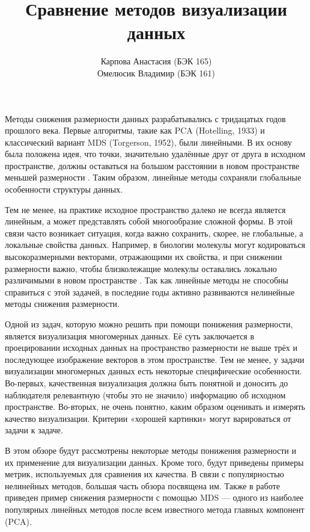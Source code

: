 \documentclass[10pt, a4paper]{extarticle}
\title{Сравнение методов визуализации данных}
\author{Карпова Анастасия (БЭК 165) \\ Омелюсик Владимир (БЭК 161)}
\begin{document}
\maketitle
\vspace{-1.1cm}
\tableofcontents
\vspace{1em}
\thispagestyle{empty}

Методы снижения размерности данных разрабатывались с тридацатых годов прошлого века. 
Первые алгоритмы, такие как PCA (Hotelling, 1933) и классический вариант MDS (Torgerson, 1952), были линейными.
В их основу была положена идея, что точки, значительно удалённые друг от друга в исходном пространстве, должны оставаться на большом расстоянии в новом пространстве меньшей размерности \cite{maaten2008visualizing}. 
Таким образом, линейные методы сохраняли глобальные особенности структуры данных. 

Тем не менее, на практике исходное пространство далеко не всегда является линейным, а может представлять собой многообразие сложной формы.
В этой связи часто возникает ситуация, когда важно сохранить, скорее, не глобальные, а локальные свойства данных. 
Например, в биологии молекулы могут кодироваться высокоразмерными векторами, отражающими их свойства, и при снижении размерности важно, чтобы близколежащие молекулы оставались локально различимыми в новом пространстве \cite{tmap}. 
Так как линейные методы не способны справиться с этой задачей, в последние годы активно развиваются нелинейные методы снижения размерности.

Одной из задач, которую можно решить при помощи понижения размерности, является визуализация многомерных данных.
Её суть заключается в  проецировании исходных данных на пространство размерности не выше трёх и последующее изображение векторов в этом пространстве. 
Тем не менее, у задачи визуализации многомерных данных есть некоторые специфические особенности. 
Во-первых, качественная визуализация должна быть понятной и доносить до наблюдателя релевантную (чтобы это не значило) информацию об исходном пространстве.
Во-вторых, не очень понятно, каким образом оценивать и измерять качество визуализации.
Критерии «хорошей картинки» могут варироваться от задачи к задаче.

В этом обзоре будут рассмотрены некоторые методы понижения размерности и их применение для визуализации данных.
Кроме того, будут приведены примеры метрик, используемых для сравнения их качества. 
В связи с популярностью нелинейных методов, большая часть обзора посвящена им. 
Также в работе приведен пример снижения размерности с помощью MDS — одного из наиболее популярных линейных методов после всем известного метода главных компонент (PCA). 
\end{document}
